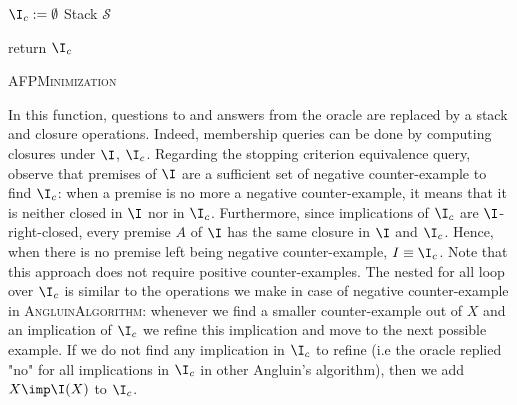 \vspace{1.2em}


\begin{algorithm}
	
	\BlankLine
	\BlankLine
	
	$\I_c := \emptyset$ \;
	Stack $\mathcal{S}$ \;
	
	\BlankLine
	

	return $\I_c$ \;
	
	
	\caption{\textsc{AFPMinimization}}
	\label{alg:AFP}
\end{algorithm}

\noindent In this function, questions to and answers from the oracle are replaced by a stack and closure operations. Indeed, membership queries can
be done by computing closures under $\I$, $\I_c$. Regarding the stopping 
criterion equivalence query, observe that premises of $\I$ are a sufficient set of negative counter-example to find $\I_c$: when a premise is no more a negative counter-example, it means that it is neither closed in $\I$ nor in 
$\I_c$. Furthermore, since implications of $\I_c$ are $\I$-right-closed, every
premise $A$ of $\I$ has the same closure in $\I$ and $\I_c$. Hence, when there
is no premise left being negative counter-example, $I \equiv \I_c$. Note that this approach does not require positive counter-examples. The nested for all loop over $\I_c$ is similar to the operations we make in case of negative counter-example in \textsc{AngluinAlgorithm}: whenever we find a smaller counter-example out of $X$ and an implication of $\I_c$ we refine this implication and move to the next possible example. If we do not find any implication in $\I_c$ to refine (i.e the oracle replied "no" for all implications in $\I_c$ in other Angluin's algorithm), then we add $X \imp \I(X)$ to $\I_c$. 

